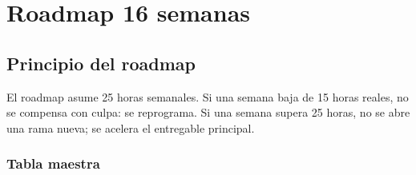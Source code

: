 \chapter{Roadmap 16 semanas}

\section{Principio del roadmap}


El roadmap asume 25 horas semanales. Si una semana baja de 15 horas reales, no se compensa con culpa: se reprograma. Si una semana supera 25 horas, no se abre una rama nueva; se acelera el entregable principal.


\subsection{Tabla maestra}


